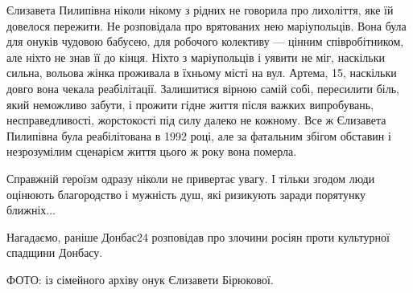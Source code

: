 Єлизавета Пилипівна ніколи нікому з рідних не говорила про лихоліття, яке їй
довелося пережити. Не розповідала про врятованих нею маріупольців. Вона була
для онуків чудовою бабусею, для робочого колективу — цінним співробітником, але
ніхто не знав її до кінця. Ніхто з маріупольців і уявити не міг, наскільки
сильна, вольова жінка проживала в їхньому місті на вул. Артема, 15, наскільки
довго вона чекала реабілітації. Залишитися вірною самій собі, пересилити біль,
який неможливо забути, і прожити гідне життя після важких випробувань,
несправедливості, жорстокості під силу далеко не кожному. Все ж Єлизавета
Пилипівна була реабілітована в 1992 році, але за фатальним збігом обставин і
незрозумілим сценарієм життя цього ж року вона померла.

Справжній героїзм одразу ніколи не привертає увагу. І тільки згодом люди
оцінюють благородство і мужність душ, які ризикують заради порятунку ближніх...

Нагадаємо, раніше Донбас24 розповідав про злочини росіян проти культурної
спадщини Донбасу.

ФОТО: із сімейного архіву онук Єлизавети Бірюкової.
